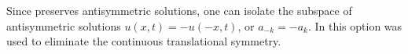 Since \KSe preserves antisymmetric solutions, one can isolate the subspace of 
antisymmetric solutions $u(x,t)=-u(-x,t)$,
or $a_{-k}= - a_k$. In  
this option was used to eliminate
the continuous translational symmetry.

